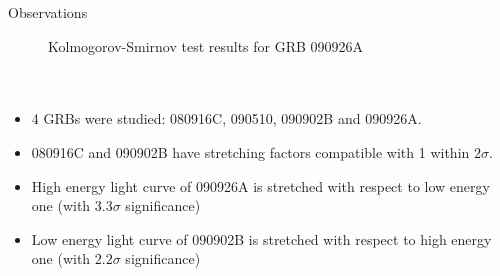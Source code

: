 \documentclass[final]{beamer}
\newlength{\onecolwid}
\begin{document}
\begin{frame}[t]
\begin{columns}[t]
\begin{column}{\onecolwid}
\begin{block}{Observations}
\begin{figure}
{\large Kolmogorov-Smirnov test results for GRB 090926A} \\[0.5ex]
 \\
 \\
\end{figure}

\begin{itemize}
\item{4 GRBs were studied: 080916C, 090510, 090902B and 090926A.}
\item{080916C and 090902B have stretching factors compatible with 1 within $2\sigma$.}
\item{High energy light curve of 090926A is stretched with respect to low energy one (with $3.3\sigma$ significance)}
\item{Low energy light curve of 090902B is stretched with respect to high energy one (with $2.2\sigma$ significance)}
\end{itemize}


\end{block}
\end{column}
\end{columns}
\end{frame}
\end{document}
